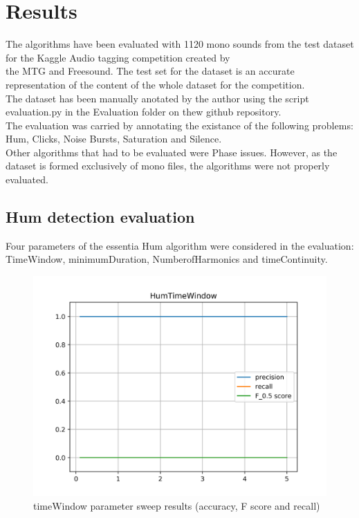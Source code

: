
\chapter{Results}

The algorithms have been evaluated with 1120 mono sounds from the test dataset for the Kaggle Audio tagging competition created by \\
the MTG and Freesound. The test set for the dataset is an accurate representation of the content of the whole dataset for the competition. \\
The dataset has been manually anotated by the author using the script evaluation.py in the Evaluation folder on thew github repository. \\
The evaluation was carried by annotating the existance of the following problems: Hum, Clicks, Noise Bursts, Saturation and Silence. \\
Other algorithms that had to be evaluated were Phase issues. However, as the dataset is formed exclusively of mono files, the algorithms were not properly evaluated.

\section{Hum detection evaluation}
Four parameters of the essentia Hum algorithm were considered in the evaluation: TimeWindow, minimumDuration, NumberofHarmonics and timeContinuity.

\begin{figure}[!ht]
	\includegraphics[clip,width=\columnwidth]{Figures/HumTimeWindow.png}%
	\caption{timeWindow parameter sweep results (accuracy, F score and recall)}
	\label{fig:humTimeWindow}
\end{figure}


